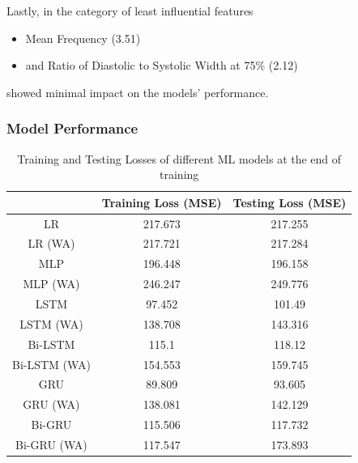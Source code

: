 Lastly, in the category of least influential features
\begin{itemize}
    \item Mean Frequency (3.51)
    \item and Ratio of Diastolic to Systolic Width at 75\% (2.12)
\end{itemize}
showed minimal impact on the models' performance.

\subsubsection{Model Performance}
\label{subsubsec:model_performance}

\begin{table}[p]
    \renewcommand{\arraystretch}{1.5}
    \begin{center}
        \footnotesize
        \begin{tabular}{ |c|c|c| }
            \hline
            & Training Loss (MSE)        & Testing Loss (MSE)          \\
            \hline
            LR           & \cellcolor{red!10}217.673  & \cellcolor{red!10}217.255   \\
            \hline
            LR (WA)      & \cellcolor{red!20}217.721  & \cellcolor{red!20}217.284   \\
            \hline
            MLP          & 196.448                    & 196.158                     \\
            \hline
            MLP (WA)     & \cellcolor{red!30}246.247  & \cellcolor{red!30}249.776   \\
            \hline
            LSTM         & \cellcolor{green!20}97.452 & \cellcolor{green!20}101.49  \\
            \hline
            LSTM (WA)    & 138.708                    & 143.316                     \\
            \hline
            Bi-LSTM      & \cellcolor{green!10}115.1  & 118.12                      \\
            \hline
            Bi-LSTM (WA) & 154.553                    & 159.745                     \\
            \hline
            GRU          & \cellcolor{green!30}89.809 & \cellcolor{green!30}93.605  \\
            \hline
            GRU (WA)     & 138.081                    & 142.129                     \\
            \hline
            Bi-GRU       & 115.506                    & \cellcolor{green!10}117.732 \\
            \hline
            Bi-GRU (WA)  & 117.547                    & 173.893                     \\
            \hline
        \end{tabular}
    \end{center}
    \captionsetup{format=plain, justification=centering, font=small}
    \caption{Training and Testing Losses of different ML models at the end of training}
    \label{tab:train_test_mse}
\end{table}

